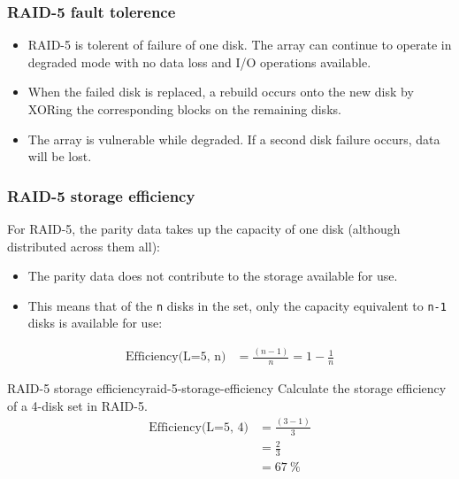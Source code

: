 \documentclass[slides]{pgnotes}
\begin{document}
\newpage
\subsubsection{RAID-5 fault tolerence}
\label{sec:raid-5-fault-tolerence}

\begin{itemize}
\item
  RAID-5 is tolerent of failure of one disk. The array can continue to
  operate in degraded mode with no data loss and I/O operations
  available.
\item
  When the failed disk is replaced, a rebuild occurs onto the new disk
  by XORing the corresponding blocks on the remaining disks.
\item
  The array is vulnerable while degraded. If a second disk failure
  occurs, data will be lost.
\end{itemize}


\newpage
\subsubsection{RAID-5 storage efficiency}
\label{sec:raid-5-storage-efficiency}

For RAID-5, the parity data takes up the capacity of one disk (although
distributed across them all):
\begin{itemize}
\item The parity data does not contribute to the storage available for use.
\item This means that of the \texttt{n} disks in the set, only the capacity equivalent to \texttt{n-1} disks is available for use:
\end{itemize}
\begin{align}
  \mbox{Efficiency(L=5, n)} & =  \frac{( n - 1 )}{n}  =  1 - \frac{1}{n} \label{eq:raid-5-storage-efficiency}
\end{align}

\begin{example}{RAID-5 storage efficiency}{raid-5-storage-efficiency}
  Calculate the storage efficiency of a 4-disk set in RAID-5.
  \tcblower
  \begin{align}
  \mbox{Efficiency(L=5, 4)} & =  \frac{( 3 - 1 )}{3}  \\
                            & = \frac{2}{3} \\
                            & = \SI{67}{\percent} 
  \end{align}  
\end{example}
\end{document}
